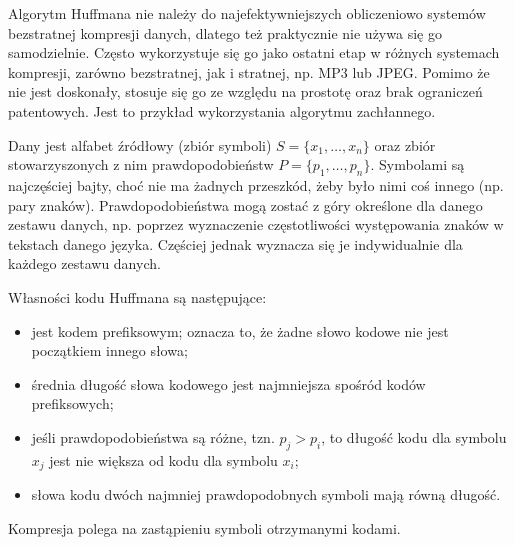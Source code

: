 Algorytm Huffmana nie należy do najefektywniejszych obliczeniowo systemów bezstratnej kompresji danych,
dlatego też praktycznie nie używa się go samodzielnie.
Często wykorzystuje się go jako ostatni etap w różnych systemach kompresji,
zarówno bezstratnej, jak i stratnej, np. MP3 lub JPEG.
Pomimo że nie jest doskonały, stosuje się go ze względu na prostotę oraz brak ograniczeń patentowych.
Jest to przykład wykorzystania algorytmu zachłannego.

Dany jest alfabet źródłowy (zbiór symboli) $S=\{x_{1}, \dots, x_{n}\}$
oraz zbiór stowarzyszonych z nim prawdopodobieństw $P=\{p_{1}, \dots, p_{n}\}$.
Symbolami są najczęściej bajty, choć nie ma żadnych przeszkód, żeby było nimi coś innego (np. pary znaków).
Prawdopodobieństwa mogą zostać z góry określone dla danego zestawu danych,
np. poprzez wyznaczenie częstotliwości występowania znaków w tekstach danego języka.
Częściej jednak wyznacza się je indywidualnie dla każdego zestawu danych.

Własności kodu Huffmana są następujące:
\begin{itemize}[itemsep=0pt,partopsep=0pt, parsep=0pt]
    \item jest kodem prefiksowym; oznacza to, że żadne słowo kodowe nie jest początkiem innego słowa;
    \item średnia długość słowa kodowego jest najmniejsza spośród kodów prefiksowych;
    \item jeśli prawdopodobieństwa są różne, tzn. $p_{j}>p_{i}$,
    to długość kodu dla symbolu $x_{j}$ jest nie większa od kodu dla symbolu $x_{i}$;
    \item słowa kodu dwóch najmniej prawdopodobnych symboli mają równą długość.
\end{itemize}
Kompresja polega na zastąpieniu symboli otrzymanymi kodami.
